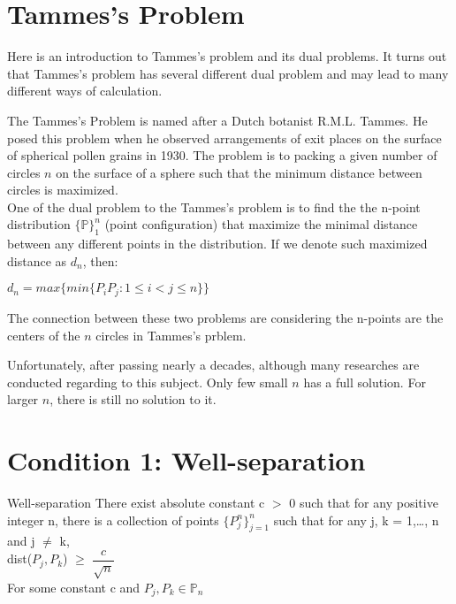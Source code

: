 \documentclass[12pt]{article}
\numberwithin{equation}{section}
\let\bb\mathbb
\newenvironment{general}[2][]{\begin{box_for_gene}[#1]{#2}}{\end{box_for_gene}}
\let\bb\mathbb
\begin{document}
	\section{Tammes's Problem}
	Here is an introduction to Tammes's problem and its dual problems. It turns out that Tammes's problem has several different dual problem and may lead to many different ways of calculation. \par 
	The Tammes's Problem is named after a Dutch botanist R.M.L. Tammes. He posed this problem when he observed arrangements of exit places on the surface of spherical pollen grains in 1930. The problem is to packing a given number of circles $n$ on the surface of a sphere such that the minimum distance between circles is maximized.\\
	One of the dual problem to the Tammes's problem is to find the the n-point distribution $\{\bb{P}\}_1^n$ (point configuration) that maximize the minimal distance between any different points in the distribution. If we denote such maximized distance as $d_n$, then: \par 
		$d_n = max\{min\{P_iP_j: 1\leq i<j\leq n\}\}$ \par 
		
		The connection between these two problems are considering the n-points are the centers of the $n$ circles in Tammes's prblem.\par 
	Unfortunately, after passing nearly a decades, although many researches are conducted regarding to this subject. Only few small $n$ has a full solution. For larger $n$, there is still no  solution to it.
	\vspace{10mm}

	
	\newpage
	
	\section{Condition 1: Well-separation}
		\begin{general}[c1]{Well-separation}
		There exist absolute constant c $>$ 0 such that for any positive integer n, there is a collection of points $\{ P_j^n \}_{j=1}^n$ such that 
		for any j, k = 1,\dots, n and j $\neq$ k, \\
		dist($P_j, P_k$) $\geq$ $\dfrac{c}{\sqrt{n}}$ \\
		For some constant c and $P_j, P_k \in \bb{P}_n$
		\end{general}

	\vspace{10mm}
	
\end{document}
